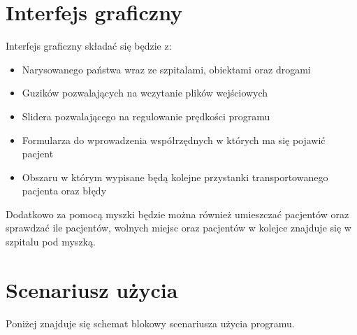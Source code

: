 \documentclass[a4paper,12pt,twoside]{article}
\begin{document}
\section{Interfejs graficzny}
Interfejs graficzny składać się będzie z:
\begin{itemize}
	\item Narysowanego państwa wraz ze szpitalami, obiektami oraz drogami
	\item Guzików pozwalających na wczytanie plików wejściowych
	\item Slidera pozwalającego na regulowanie prędkości programu
	\item Formularza do wprowadzenia współrzędnych w których ma się pojawić pacjent
	\item Obszaru w którym wypisane będą kolejne przystanki transportowanego pacjenta oraz błędy
\end{itemize}
Dodatkowo za pomocą myszki będzie można również umieszczać pacjentów oraz sprawdzać ile pacjentów, wolnych miejsc oraz pacjentów w kolejce znajduje się w szpitalu pod myszką.

\section{Scenariusz użycia}
Poniżej znajduje się schemat blokowy scenariusza użycia programu.
\end{document}
